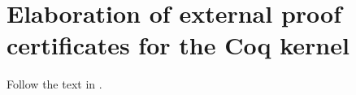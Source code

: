 
\section{Elaboration of external proof certificates for the Coq
  kernel}

Follow the text in \cite{blanco20coq}.

